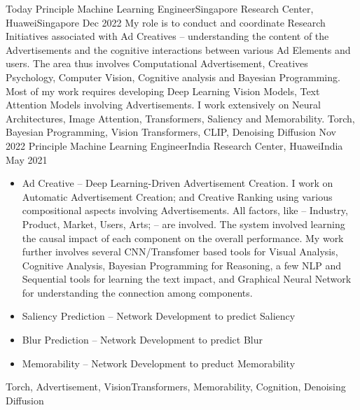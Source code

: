 %
%
%

\begin{experiences}
		\experience
	{Today} {Principle Machine Learning Engineer}{Singapore Research Center, Huawei}{Singapore}
	{Dec 2022}{
		My role is to conduct and coordinate Research Initiatives associated with Ad Creatives -- understanding the content of the Advertisements and the cognitive interactions between various Ad Elements and users. The area thus involves Computational Advertisement, Creatives Psychology, Computer Vision, Cognitive analysis and Bayesian Programming. Most of my work requires developing Deep Learning Vision Models, Text Attention Models involving Advertisements. I work extensively on Neural Architectures, Image Attention, Transformers, Saliency and Memorability.
	}
	{Torch, Bayesian Programming, Vision Transformers, CLIP, Denoising Diffusion }
	\emptySeparator
	\experience
	{Nov 2022} {Principle Machine Learning Engineer}{India Research Center, Huawei}{India}
	{May 2021}{
		\begin{itemize}
			\item Ad Creative -- Deep Learning-Driven Advertisement Creation. I work on Automatic Advertisement Creation; and Creative Ranking using various compositional aspects involving Advertisements. All factors, like -- Industry, Product, Market, Users, Arts; -- are involved. The system involved learning the causal impact of each component on the overall performance. My work further involves several CNN/Transfomer based tools for Visual Analysis, Cognitive Analysis, Bayesian Programming for Reasoning, a few NLP and Sequential tools for learning the text impact, and Graphical Neural Network for understanding the connection among components.
			\item Saliency Prediction -- Network Development to predict Saliency
			\item Blur Prediction -- Network Development to predict Blur
			\item Memorability -- Network Development to preduct Memorability
		\end{itemize}
	}
	{Torch, Advertisement,  VisionTransformers,  Memorability, Cognition, Denoising Diffusion}
	\emptySeparator

\end{experiences}
